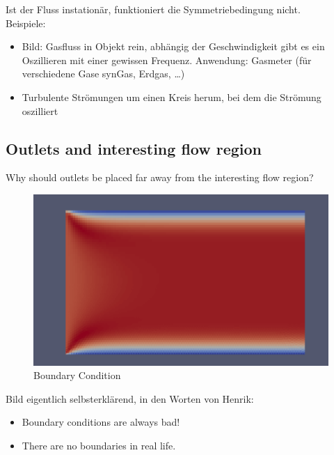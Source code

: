 \documentclass[a4paper]{scrartcl}
\begin{document}

Ist der Fluss instationär, funktioniert die Symmetriebedingung nicht.\\

Beispiele:\\
\begin{itemize}
  \item Bild: Gasfluss in Objekt rein, abhängig der Geschwindigkeit gibt es ein
  Oszillieren mit einer gewissen Frequenz. Anwendung: Gasmeter (für
  verschiedene Gase synGas, Erdgas, \ldots)
  \item Turbulente Strömungen um einen Kreis herum, bei dem die Strömung
  oszilliert
\end{itemize}

\subsection{Outlets and interesting flow region}
Why should outlets be placed far away from the interesting flow
region?\\

\begin{figure}[h!]
\begin{center}
\includegraphics[scale=0.8]{images/inlet_error.pdf}
\caption{Boundary Condition}
\label{fig:Boundary}
\end{center}
\end{figure}

Bild eigentlich selbsterklärend, in den Worten von Henrik:\\
\begin{itemize}
  \item Boundary conditions are always bad!
  \item There are no boundaries in real life.
\end{itemize}
\end{document}

